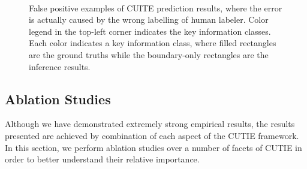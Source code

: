 \documentclass[10pt,twocolumn,letterpaper]{article}
\begin{document}
\begin{figure}
\begin{center}
\\
\end{center}
   \caption{False positive examples of CUITE prediction results, where the error is actually caused by the wrong labelling of human labeler. Color legend in the top-left corner indicates the key information classes. Each color indicates a key information class, where filled rectangles are the ground truths while the boundary-only rectangles are the inference results.}
\label{fig:falselabel}
\end{figure}


\subsection{Ablation Studies}
Although we have demonstrated extremely strong empirical results, the results presented are achieved by combination of each aspect of the CUTIE framework. In this section, we perform ablation studies over a number of facets of CUTIE in order to better understand their relative importance.
\end{document}
